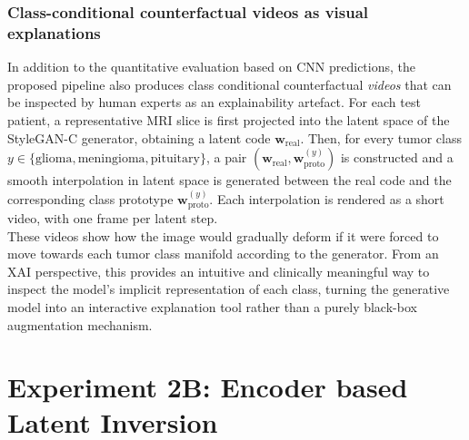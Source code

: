 \subsubsection{Class-conditional counterfactual videos as visual explanations}

In addition to the quantitative evaluation based on CNN predictions, the proposed pipeline also produces class conditional counterfactual \emph{videos} that can be inspected by human experts as an explainability artefact. For each test patient, a representative MRI slice is first projected into the latent space of the StyleGAN-C generator, obtaining a latent code $\mathbf{w}_{\text{real}}$. Then, for every tumor class $y \in \{\text{glioma}, \text{meningioma}, \text{pituitary}\}$, a pair $(\mathbf{w}_{\text{real}}, \mathbf{w}_{\text{proto}}^{(y)})$ is constructed and a smooth interpolation in latent space is generated between the real code and the corresponding class prototype $\mathbf{w}_{\text{proto}}^{(y)}$. Each interpolation is rendered as a short video, with one frame per latent step.\\

These videos show how the image would gradually deform if it were forced to move towards each tumor class manifold according to the generator. From an XAI perspective, this provides an intuitive and clinically meaningful way to inspect the model's implicit representation of each class, turning the generative model into an interactive explanation tool rather than a purely black-box augmentation mechanism.

\clearpage


\section{Experiment 2B: Encoder based Latent Inversion}
\label{sec:exp2B_method}

